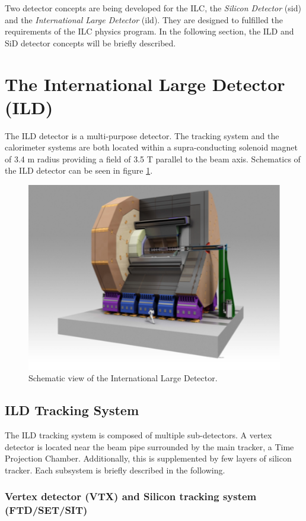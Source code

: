 Two detector concepts are being developed for the ILC, the \textit{Silicon Detector} (\acrshort{sid}) and the \textit{International Large Detector} (\acrshort{ild}). They are designed to fulfilled the requirements of the ILC physics program. In the following section, the ILD and SiD detector concepts will be briefly described.

\section{The International Large Detector (ILD)}
\label{sec:ILD}

The ILD detector is a multi-purpose detector. The tracking system and the calorimeter systems are both located within a supra-conducting solenoid magnet of 3.4 m radius providing a field of 3.5 T parallel to the beam axis. Schematics of the ILD detector can be seen in figure \ref{fig:ILD}.

\begin{figure}[htbp!]
  \centering
  \includegraphics[width=0.7\linewidth]{chap2/fig/ILD_full.png}
  \caption{Schematic view of the International Large Detector. \cite{ILC_TDR_Vol4}} \label{fig:ILD}
\end{figure}

\subsection{ILD Tracking System}

The ILD tracking system is composed of multiple sub-detectors. A vertex detector is located near the beam pipe surrounded by the main tracker, a Time Projection Chamber. Additionally, this is supplemented by few layers of silicon tracker. Each subsystem is briefly described in the following.

\subsubsection{Vertex detector (VTX) and Silicon tracking system (FTD/SET/SIT)}

